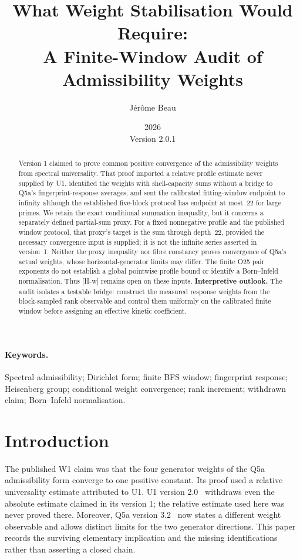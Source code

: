 \documentclass[12pt]{article}
\title{What Weight Stabilisation Would Require:\\
A Finite-Window Audit of Admissibility Weights}
\author{J\'er\^ome Beau}
\date{2026\\[2pt]\small Version 2.0.1}
\theoremstyle{definition}
\theoremstyle{remark}
\begin{document}
  \maketitle

  \begin{abstract}
    Version 1 claimed to prove common positive convergence of the admissibility
    weights from spectral universality.
    That proof imported a relative profile estimate never supplied by U1, identified
    the weights with shell-capacity sums without a bridge to Q5a's fingerprint-response
    averages, and sent the calibrated fitting-window endpoint to infinity although
    the established five-block protocol has endpoint at most~22 for large primes.
    We retain the exact conditional summation inequality, but it concerns a separately
    defined partial-sum proxy.
    For a fixed nonnegative profile and the published window protocol, that proxy's
    target is the sum through depth~22, provided the necessary convergence input is
    supplied; it is not the infinite series asserted in version~1.
    Neither the proxy inequality nor fibre constancy proves convergence of Q5a's
    actual weights, whose horizontal-generator limits may differ.
    The finite O25 pair exponents do not establish a global pointwise profile bound
    or identify a Born--Infeld normalisation.
    Thus [H-w] remains open on these inputs.
    \textbf{Interpretive outlook.}
    The audit isolates a testable bridge: construct the measured response weights
    from the block-sampled rank observable and control them uniformly on the
    calibrated finite window before assigning an effective kinetic coefficient.
  \end{abstract}

  \paragraph{Keywords.}
    Spectral admissibility; Dirichlet form; finite BFS window; fingerprint response;
    Heisenberg group; conditional weight convergence; rank increment;
    withdrawn claim; Born--Infeld normalisation.

    \clearpage
    \tableofcontents

    \clearpage

  \section{Introduction}
  \label{sec:intro}

  The published W1 claim was that the four generator weights of the Q5a
  admissibility form converge to one positive constant.
  Its proof used a relative universality estimate attributed to U1.
  U1 version 2.0~\cite{Beau2026u1} withdraws even the absolute estimate claimed
  in its version 1; the relative estimate used here was never proved there.
  Moreover, Q5a version 3.2~\cite{Beau2026q5a} now states a different weight
  observable and allows distinct limits for the two generator directions.
  This paper records the surviving elementary implication and the missing
  identifications rather than asserting a closed chain.
\end{document}
